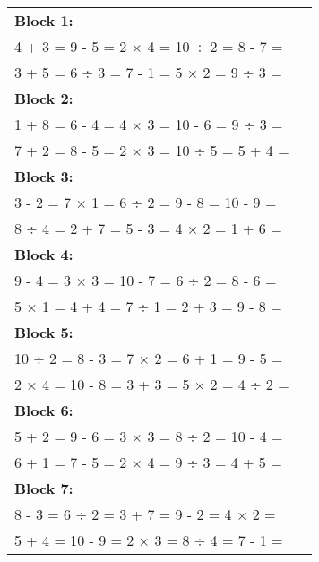 \documentclass[a4paper,12pt]{scrartcl}
\begin{document}
\thispagestyle{empty}

\centering
\raggedright

\begin{adjustbox}{center, valign=c}
\begin{tabular}{@{}p{0.95\linewidth}@{}}

\textbf{Block 1:}\\
4 + 3 = \hfill 9 - 5 = \hfill 2 × 4 = \hfill 10 ÷ 2 = \hfill 8 - 7 =\\
3 + 5 = \hfill 6 ÷ 3 = \hfill 7 - 1 = \hfill 5 × 2 = \hfill 9 ÷ 3 =\\[0.6em]

\textbf{Block 2:}\\
1 + 8 = \hfill 6 - 4 = \hfill 4 × 3 = \hfill 10 - 6 = \hfill 9 ÷ 3 =\\
7 + 2 = \hfill 8 - 5 = \hfill 2 × 3 = \hfill 10 ÷ 5 = \hfill 5 + 4 =\\[0.6em]

\textbf{Block 3:}\\
3 - 2 = \hfill 7 × 1 = \hfill 6 ÷ 2 = \hfill 9 - 8 = \hfill 10 - 9 =\\
8 ÷ 4 = \hfill 2 + 7 = \hfill 5 - 3 = \hfill 4 × 2 = \hfill 1 + 6 =\\[0.6em]

\textbf{Block 4:}\\
9 - 4 = \hfill 3 × 3 = \hfill 10 - 7 = \hfill 6 ÷ 2 = \hfill 8 - 6 =\\
5 × 1 = \hfill 4 + 4 = \hfill 7 ÷ 1 = \hfill 2 + 3 = \hfill 9 - 8 =\\[0.6em]

\textbf{Block 5:}\\
10 ÷ 2 = \hfill 8 - 3 = \hfill 7 × 2 = \hfill 6 + 1 = \hfill 9 - 5 =\\
2 × 4 = \hfill 10 - 8 = \hfill 3 + 3 = \hfill 5 × 2 = \hfill 4 ÷ 2 =\\[0.6em]

\textbf{Block 6:}\\
5 + 2 = \hfill 9 - 6 = \hfill 3 × 3 = \hfill 8 ÷ 2 = \hfill 10 - 4 =\\
6 + 1 = \hfill 7 - 5 = \hfill 2 × 4 = \hfill 9 ÷ 3 = \hfill 4 + 5 =\\[0.6em]

\textbf{Block 7:}\\
8 - 3 = \hfill 6 ÷ 2 = \hfill 3 + 7 = \hfill 9 - 2 = \hfill 4 × 2 =\\
5 + 4 = \hfill 10 - 9 = \hfill 2 × 3 = \hfill 8 ÷ 4 = \hfill 7 - 1 =\\[0.6em]


\end{tabular}
\end{adjustbox}
\end{document}
